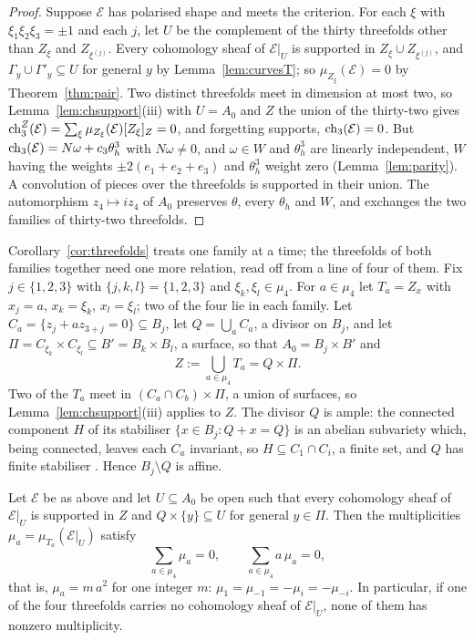 \begin{proof}
Suppose $\mathcal{E}$ has polarised shape and meets the criterion. For each $\xi$ with $\xi_{1}\xi_{2}\xi_{3}=\pm1$ and each $j$, let $U$ be the complement of the thirty threefolds other than $Z_{\xi}$ and $Z_{\xi^{(j)}}$. Every cohomology sheaf of $\mathcal{E}|_{U}$ is supported in $Z_{\xi}\cup Z_{\xi^{(j)}}$, and $\Gamma_{y}\cup\Gamma'_{y}\subseteq U$ for general $y$ by Lemma~\ref{lem:curvesT}; so $\mu_{Z_{\xi}}(\mathcal{E})=0$ by Theorem~\ref{thm:pair}. Two distinct threefolds meet in dimension at most two, so Lemma~\ref{lem:chsupport}(iii) with $U=A_{0}$ and $Z$ the union of the thirty-two gives $\mathrm{ch}^{Z}_{3}(\mathcal{E})=\sum_{\xi}\mu_{Z_{\xi}}(\mathcal{E})[Z_{\xi}]_{Z}=0$, and forgetting supports, $\mathrm{ch}_{3}(\mathcal{E})=0$. But $\mathrm{ch}_{3}(\mathcal{E})=N\omega+c_{3}\theta_{h}^{3}$ with $N\omega\ne0$, and $\omega\in W$ and $\theta_{h}^{3}$ are linearly independent, $W$ having the weights $\pm2(e_{1}+e_{2}+e_{3})$ and $\theta_{h}^{3}$ weight zero (Lemma~\ref{lem:parity}). A convolution of pieces over the threefolds is supported in their union. The automorphism $z_{4}\mapsto iz_{4}$ of $A_{0}$ preserves $\theta$, every $\theta_{h}$ and $W$, and exchanges the two families of thirty-two threefolds.
\end{proof}

Corollary~\ref{cor:threefolds} treats one family at a time; the threefolds of both families together need one more relation, read off from a line of four of them. Fix $j\in\{1,2,3\}$ with $\{j,k,l\}=\{1,2,3\}$ and $\xi_{k},\xi_{l}\in\mu_{4}$. For $a\in\mu_{4}$ let $T_{a}=Z_{x}$ with $x_{j}=a$, $x_{k}=\xi_{k}$, $x_{l}=\xi_{l}$; two of the four lie in each family. Let $C_{a}=\{z_{j}+az_{3+j}=0\}\subseteq B_{j}$, let $Q=\bigcup_{a}C_{a}$, a divisor on $B_{j}$, and let $\Pi=C_{\xi_{k}}\times C_{\xi_{l}}\subseteq B'=B_{k}\times B_{l}$, a surface, so that $A_{0}=B_{j}\times B'$ and
\[
Z:=\bigcup_{a\in\mu_{4}}T_{a}=Q\times\Pi .
\]
Two of the $T_{a}$ meet in $(C_{a}\cap C_{b})\times\Pi$, a union of surfaces, so Lemma~\ref{lem:chsupport}(iii) applies to $Z$. The divisor $Q$ is ample: the connected component $H$ of its stabiliser $\{x\in B_{j}:Q+x=Q\}$ is an abelian subvariety which, being connected, leaves each $C_{a}$ invariant, so $H\subseteq C_{1}\cap C_{i}$, a finite set, and $Q$ has finite stabiliser \cite[\S6, Application~1]{Mum70}. Hence $B_{j}\setminus Q$ is affine.

\begin{lemma}\label{lem:fourline}
Let $\mathcal{E}$ be as above and let $U\subseteq A_{0}$ be open such that every cohomology sheaf of $\mathcal{E}|_{U}$ is supported in $Z$ and $Q\times\{y\}\subseteq U$ for general $y\in\Pi$. Then the multiplicities $\mu_{a}=\mu_{T_{a}}(\mathcal{E}|_{U})$ satisfy
\[
\sum_{a\in\mu_{4}}\mu_{a}=0,\qquad\sum_{a\in\mu_{4}}a\,\mu_{a}=0,
\]
that is, $\mu_{a}=m\,a^{2}$ for one integer $m$: $\mu_{1}=\mu_{-1}=-\mu_{i}=-\mu_{-i}$. In particular, if one of the four threefolds carries no cohomology sheaf of $\mathcal{E}|_{U}$, none of them has nonzero multiplicity.
\end{lemma}

